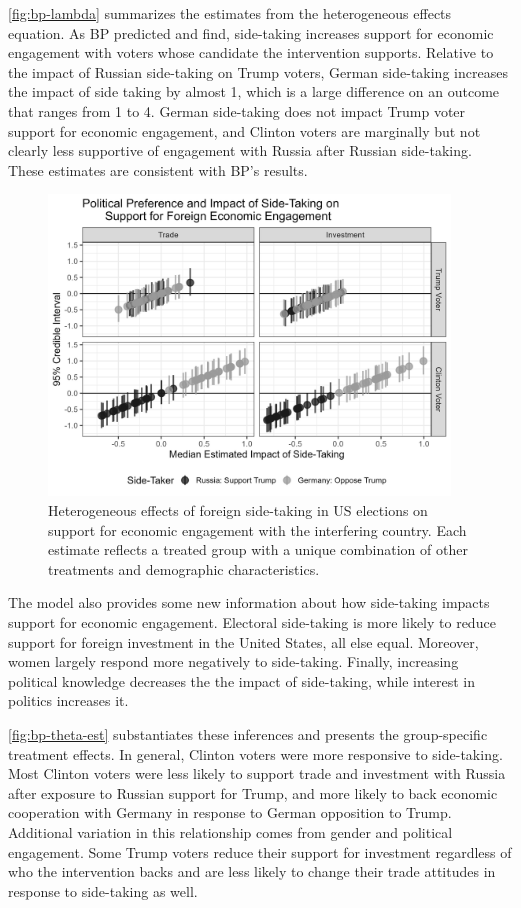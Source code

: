 \documentclass[12pt]{article}
\begin{document}
\autoref{fig:bp-lambda} summarizes the estimates from the heterogeneous effects equation. 
As BP predicted and find, side-taking increases support for economic engagement with voters whose candidate the intervention supports. 
Relative to the impact of Russian side-taking on Trump voters, German side-taking increases the impact of side taking by almost 1, which is a large difference on an outcome that ranges from 1 to 4. 
German side-taking does not impact Trump voter support for economic engagement, and Clinton voters are marginally but not clearly less supportive of engagement with Russia after Russian side-taking.
These estimates are consistent with BP's results. 


\begin{figure}[htpb]
	\centering
		\includegraphics[width=0.95\textwidth]{../figures/bp-theta-est.png}
	\caption{Heterogeneous effects of foreign side-taking in US elections on support for economic engagement with the interfering country. Each estimate reflects a treated group with a unique combination of other treatments and demographic characteristics.}
	\label{fig:bp-theta-est}
\end{figure}


The model also provides some new information about how side-taking impacts support for economic engagement. 
Electoral side-taking is more likely to reduce support for foreign investment in the United States, all else equal. 
Moreover, women largely respond more negatively to side-taking. 
Finally, increasing political knowledge decreases the the impact of side-taking, while interest in politics increases it. 


\autoref{fig:bp-theta-est} substantiates these inferences and presents the group-specific treatment effects. 
In general, Clinton voters were more responsive to side-taking. 
Most Clinton voters were less likely to support trade and investment with Russia after exposure to Russian support for Trump, and more likely to back economic cooperation with Germany in response to German opposition to Trump. 
Additional variation in this relationship comes from gender and political engagement.
Some Trump voters reduce their support for investment regardless of who the intervention backs and are less likely to change their trade attitudes in response to side-taking as well. 
\end{document}
